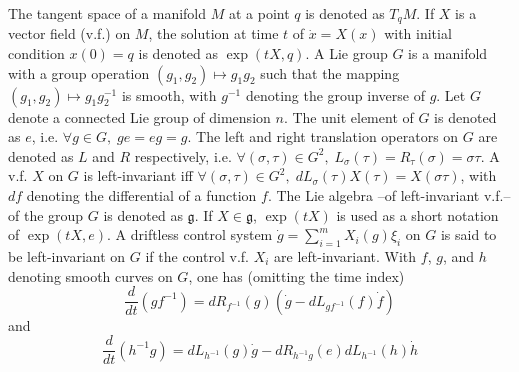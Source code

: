 \documentclass[a4paper,twoside]{article}
\def \g {{\mathfrak g}}
\begin{document}
The tangent space of a manifold $M$ at a point $q$ is denoted as $T_qM$. If $X$ is a vector field (v.f.) on $M$, the solution at time $t$ of $\dot{x}=X(x)$ with 
initial condition $x(0)=q$ is denoted as $\exp(tX,q)$.  
A Lie group $G$ is a manifold with a group operation $(g_1, g_2) \longmapsto g_1 g_2$ such that
the mapping $(g_1, g_2) \longmapsto g_1 g_2^{-1}$ is smooth, with $g^{-1}$ denoting the group inverse
of $g$.
Let $G$ denote a connected Lie group of dimension $n$. The unit element 
of $G$ is denoted as $e$, i.e. $\forall g \in G, \; g e=e g =g$. The left and right translation operators 
on $G$  are denoted as $L$ and $R$ respectively, i.e. 
$\forall (\sigma,\tau)\in G^2, \; L_{\sigma}(\tau)=R_{\tau}(\sigma)=\sigma \tau$. 
A v.f. $X$ on $G$ is left-invariant iff 
$\forall (\sigma, \tau) \in G^2, \; dL_{\sigma}(\tau) X(\tau)=X(\sigma   \tau)$, with $df$ denoting  the differential of a function $f$. The Lie algebra --of 
left-invariant v.f.-- of the group $G$
is denoted as $\g$. If $X \in \g$, $\exp(tX)$ is used as a short notation of $\exp(tX,e)$. A driftless control system 
$\dot{g}=\sum_{i=1}^m X_i(g) \xi_i$ on $G$  is said to be left-invariant on $G$ 
if the control v.f. $X_i$ are left-invariant. 
With $f$, $g$, and $h$ denoting  smooth curves on $G$, one has (omitting the time index)
\begin{equation} \label{ident1}
\frac{d}{dt}(g f^{-1})=dR_{f^{-1}}(g)\left( \dot g-dL_{gf^{-1}}(f) \dot f \right)
\end{equation}
and
\begin{equation} \label{ident2}
\frac{d}{dt}(h^{-1}g)=dL_{h^{-1}}(g) \dot g -dR_{h^{-1}g}(e) dL_{h^{-1}}(h) \dot h
\end{equation}
\end{document}
